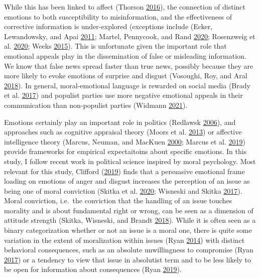 \documentclass[
  12pt,
]{article}
\begin{document}
While this has been linked to affect (Thorson \protect\hyperlink{ref-thorson2016belief}{2016}), the connection of distinct emotions to both susceptibility to misinformation, and the effectiveness of corrective information is under-explored (exceptions include (Ecker, Lewandowsky, and Apai \protect\hyperlink{ref-ecker2011terrorists}{2011}; Martel, Pennycook, and Rand \protect\hyperlink{ref-martel2020reliance}{2020}; Rosenzweig et al. \protect\hyperlink{ref-rosenzweig2020misinformation}{2020}; Weeks \protect\hyperlink{ref-weeks2015emotions}{2015}). This is unfortunate given the important role that emotional appeals play in the dissemination of false or misleading information. We know that false news spread faster than true news, possibly because they are more likely to evoke emotions of surprise and disgust (Vosoughi, Roy, and Aral \protect\hyperlink{ref-vosoughi2018spread}{2018}). In general, moral-emotional language is rewarded on social media (Brady et al. \protect\hyperlink{ref-brady2017emotion}{2017}) and populist parties use more negative emotional appeals in their communication than non-populist parties (Widmann \protect\hyperlink{ref-widmann2021how}{2021}).

Emotions certainly play an important role in politics (Redlawsk \protect\hyperlink{ref-redlawsk2006feeling}{2006}), and approaches such as cognitive appraisal theory (Moors et al. \protect\hyperlink{ref-moors2013appraisal}{2013}) or affective intelligence theory (Marcus, Neuman, and MacKuen \protect\hyperlink{ref-marcus2000affective}{2000}; Marcus et al. \protect\hyperlink{ref-marcus2019applying}{2019}) provide frameworks for empirical expectaitoins about specific emotions.
In this study, I follow recent work in political science inspired by moral psychology. Most relevant for this study, Clifford (\protect\hyperlink{ref-clifford2019emotional}{2019}) finds that a persuasive emotional frame loading on emotions of anger and disgust increases the perception of an issue as being one of moral conviction (Skitka et al. \protect\hyperlink{ref-skitka2020psychology}{2020}; Wisneski and Skitka \protect\hyperlink{ref-wisneski2017moralization}{2017}).
Moral conviction, i.e.~the conviction that the handling of an issue touches morality and is about fundamental right or wrong, can be seen as a dimension of attitude strength (Skitka, Wisneski, and Brandt \protect\hyperlink{ref-skitka2018attitude}{2018}).
While it is often seen as a binary categorization whether or not an issue is a moral one, there is quite some variation in the extent of moralization within issues (Ryan \protect\hyperlink{ref-ryan2014reconsidering}{2014}) with distinct behavioral consequences, such as an absolute unwillingness to compromise (Ryan \protect\hyperlink{ref-ryan2017no}{2017}) or a tendency to view that issue in absolutist term and to be less likely to be open for information about consequences (Ryan \protect\hyperlink{ref-ryan2019actions}{2019}).
\end{document}

